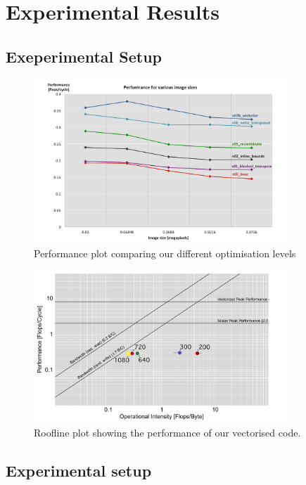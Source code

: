 \section{Experimental Results}\label{sec:exp}
\subsection{Exeperimental Setup}\label{sec:exp_setup8}

\begin{figure}
    \centering
    \includegraphics[width=0.85\textwidth]{figures/performance}
    \caption{Performance plot comparing our different optimisation levels}
\end{figure}

\begin{figure} 
    \centering
    \includegraphics[width=0.85\textwidth]{figures/roofline}
    \caption{Roofline plot showing the performance of our vectorised code.}
\end{figure}


\subsection{Experimental setup}
